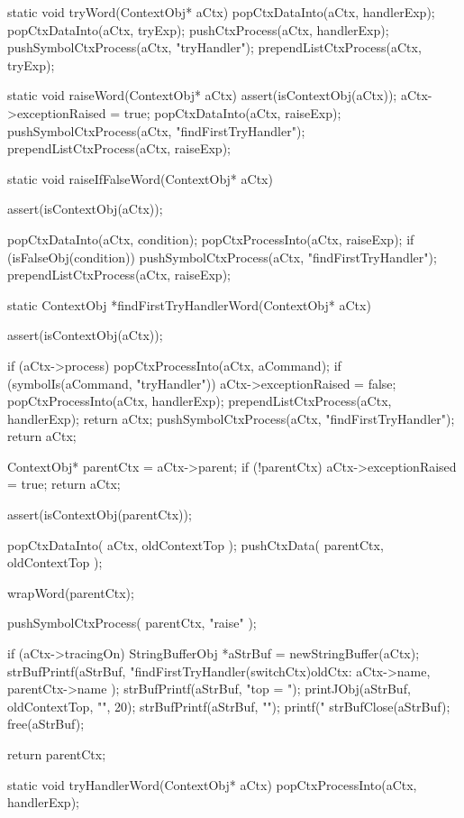 \startCCode
static void tryWord(ContextObj* aCtx) {
  popCtxDataInto(aCtx, handlerExp);
  popCtxDataInto(aCtx, tryExp);
  pushCtxProcess(aCtx, handlerExp);
  pushSymbolCtxProcess(aCtx, "tryHandler");
  prependListCtxProcess(aCtx, tryExp);
}
\stopCCode

\startCCode
static void raiseWord(ContextObj* aCtx) {
  assert(isContextObj(aCtx));
  aCtx->exceptionRaised = true;
  popCtxDataInto(aCtx, raiseExp);
  pushSymbolCtxProcess(aCtx, "findFirstTryHandler");
  prependListCtxProcess(aCtx, raiseExp);
}
\stopCCode

\startCCode
static void raiseIfFalseWord(ContextObj* aCtx) {
  assert(isContextObj(aCtx));

  popCtxDataInto(aCtx, condition);
  popCtxProcessInto(aCtx, raiseExp);
  if (isFalseObj(condition)) {
    pushSymbolCtxProcess(aCtx, "findFirstTryHandler");
    prependListCtxProcess(aCtx, raiseExp);
  }
}
\stopCCode

\startCCode
static ContextObj *findFirstTryHandlerWord(ContextObj* aCtx) {
  assert(isContextObj(aCtx));

  if (aCtx->process) {
    popCtxProcessInto(aCtx, aCommand);
    if (symbolIs(aCommand, "tryHandler")) {
      aCtx->exceptionRaised = false;
      popCtxProcessInto(aCtx, handlerExp);
      prependListCtxProcess(aCtx, handlerExp);
      return aCtx;
    }
    pushSymbolCtxProcess(aCtx, "findFirstTryHandler");
    return aCtx;
  }

  ContextObj* parentCtx = aCtx->parent;
  if (!parentCtx) {
    aCtx->exceptionRaised = true;
    return aCtx;
  }

  assert(isContextObj(parentCtx));
  
  popCtxDataInto(   aCtx,      oldContextTop );
  pushCtxData(      parentCtx, oldContextTop );
  
  wrapWord(parentCtx);
  
  pushSymbolCtxProcess( parentCtx, "raise"       );

  if (aCtx->tracingOn) {
    StringBufferObj *aStrBuf = newStringBuffer(aCtx);
    strBufPrintf(aStrBuf,
      "findFirstTryHandler(switchCtx)\n oldCtx: %
      aCtx->name, parentCtx->name
    );
    strBufPrintf(aStrBuf, "top = ");
    printJObj(aStrBuf, oldContextTop, "", 20);
    strBufPrintf(aStrBuf, "\n");
    printf("%
    strBufClose(aStrBuf);
    free(aStrBuf);
  }

  return parentCtx;
}
\stopCCode

\startCCode
static void tryHandlerWord(ContextObj* aCtx) {
  popCtxProcessInto(aCtx, handlerExp);
}
\stopCCode

